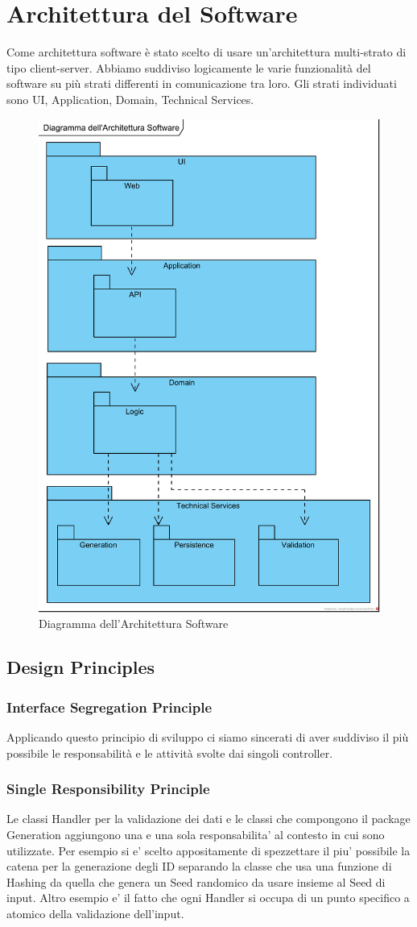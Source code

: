 \documentclass[a4paper,12pt]{report}
\begin{document}
         \section{Architettura del Software}
Come architettura software è stato scelto di usare un'architettura multi-strato di tipo client-server. Abbiamo suddiviso logicamente le varie funzionalità del software su più strati differenti in comunicazione tra loro. Gli strati individuati sono UI, Application, Domain, Technical Services.
		\begin{figure}[!h]
			\centering
			\includegraphics[width=0.5\linewidth]{image/Diagramma-dell'Architettura-Software.png}
			\caption{Diagramma dell'Architettura Software}\label{fig:Diagramma-dell'Architettura-Software.}
		\end{figure}         
\newpage
		\subsection{Design Principles}
			\subsubsection{Interface Segregation Principle}		
Applicando questo principio di sviluppo ci siamo sincerati di aver suddiviso il più possibile le responsabilità e le attività svolte dai singoli controller.
			\subsubsection{Single Responsibility Principle}
Le classi Handler per la validazione dei dati e le classi che compongono il package Generation aggiungono una e una sola responsabilita' al contesto in cui sono utilizzate.
Per esempio si e' scelto appositamente di spezzettare il piu' possibile la catena per la generazione degli ID separando la classe che usa una funzione di Hashing da quella che genera un Seed randomico da usare insieme al Seed di input.
Altro esempio e' il fatto che ogni Handler si occupa di un punto specifico a atomico della validazione dell'input.
\end{document}
